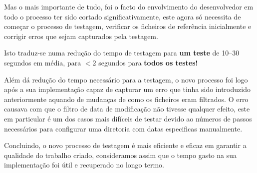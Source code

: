Mas o mais importante de tudo, foi o facto do envolvimento do desenvolvedor
em todo o processo ter sido cortado significativamente, este agora só necessita
de começar o processo de testagem, verificar os ficheiros de referência
inicialmente e corrigir erros que sejam capturados pela testagem.

Isto traduz-se numa redução do tempo de testagem para \textbf{um teste} de
\numrange{10}{30} segundos em média, para $< 2$ segundos para
\textbf{todos os testes!}

Além dá redução do tempo necessário para a testagem, o novo processo foi logo
após a sua implementação capaz de capturar um erro que tinha sido introduzido
anteriormente aquando de mudanças de como os ficheiros eram filtrados. O erro
causava com que o filtro de data de modificação não tivesse qualquer efeito,
este em particular é um dos casos mais difíceis de testar devido ao números de
passos necessários para configurar uma diretoria com datas especificas manualmente.

Concluindo, o novo processo de testagem é mais eficiente e eficaz em garantir
a qualidade do trabalho criado, consideramos assim que o tempo gasto na sua
implementação foi útil e recuperado no longo termo.
